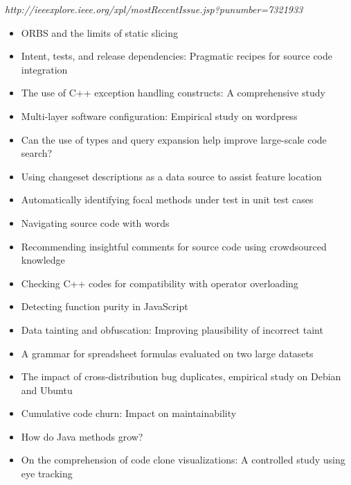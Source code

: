 {\small \em http://ieeexplore.ieee.org/xpl/mostRecentIssue.jsp?punumber=7321933}

{\small
\begin{itemize}[itemsep=-1ex]
  \item ORBS and the limits of static slicing {\color{blue} \checkmark}{\color{red} \texttimes}
  \item Intent, tests, and release dependencies: Pragmatic recipes for source code integration
  \item The use of C++ exception handling constructs: A comprehensive study {\color{blue} \checkmark}{\color{red} \texttimes}
  \item Multi-layer software configuration: Empirical study on wordpress {\color{blue} \checkmark}{\color{red} \texttimes}
  \item Can the use of types and query expansion help improve large-scale code search? {\color{blue} \checkmark}{\color{red} \texttimes}
  \item Using changeset descriptions as a data source to assist feature location {\color{blue} \checkmark}{\color{red} \texttimes}
  \item Automatically identifying focal methods under test in unit test cases {\color{blue} \checkmark}{\color{red} \texttimes}
  \item Navigating source code with words
  \item Recommending insightful comments for source code using crowdsourced knowledge {\color{blue} \checkmark}{\color{red} \texttimes}
  \item Checking C++ codes for compatibility with operator overloading {\color{blue} \checkmark}{\color{red} \texttimes}
  \item Detecting function purity in JavaScript {\color{blue} \checkmark}{\color{red} \texttimes}
  \item Data tainting and obfuscation: Improving plausibility of incorrect taint
  \item A grammar for spreadsheet formulas evaluated on two large datasets {\color{blue} \checkmark}{\color{red} \texttimes}
  \item The impact of cross-distribution bug duplicates, empirical study on Debian and Ubuntu {\color{blue} \checkmark}{\color{red} \texttimes}
  \item Cumulative code churn: Impact on maintainability
  \item How do Java methods grow?
  \item On the comprehension of code clone visualizations: A controlled study using eye tracking

\end{itemize}}
